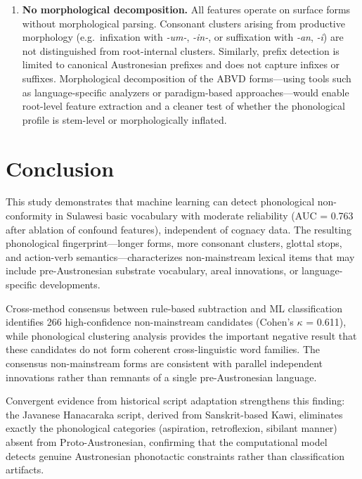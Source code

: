 \documentclass[12pt]{article}
\begin{document}
\begin{enumerate}
    \item \textbf{No morphological decomposition.} All features operate on surface forms without morphological parsing. Consonant clusters arising from productive morphology (e.g.\ infixation with \textit{-um-}, \textit{-in-}, or suffixation with \textit{-an}, \textit{-i}) are not distinguished from root-internal clusters. Similarly, prefix detection is limited to canonical Austronesian prefixes and does not capture infixes or suffixes. Morphological decomposition of the ABVD forms---using tools such as language-specific analyzers or paradigm-based approaches---would enable root-level feature extraction and a cleaner test of whether the phonological profile is stem-level or morphologically inflated.
\end{enumerate}

\section{Conclusion}

This study demonstrates that machine learning can detect phonological non-conformity in Sulawesi basic vocabulary with moderate reliability (AUC = 0.763 after ablation of confound features), independent of cognacy data.
The resulting phonological fingerprint---longer forms, more consonant clusters, glottal stops, and action-verb semantics---characterizes non-mainstream lexical items that may include pre-Austronesian substrate vocabulary, areal innovations, or language-specific developments.

Cross-method consensus between rule-based subtraction and ML classification identifies 266 high-confidence non-mainstream candidates (Cohen's $\kappa$ = 0.611), while phonological clustering analysis provides the important negative result that these candidates do not form coherent cross-linguistic word families.
The consensus non-mainstream forms are consistent with parallel independent innovations rather than remnants of a single pre-Austronesian language.

Convergent evidence from historical script adaptation strengthens this finding: the Javanese Hanacaraka script, derived from Sanskrit-based Kawi, eliminates exactly the phonological categories (aspiration, retroflexion, sibilant manner) absent from Proto-Austronesian, confirming that the computational model detects genuine Austronesian phonotactic constraints rather than classification artifacts.
\end{document}
